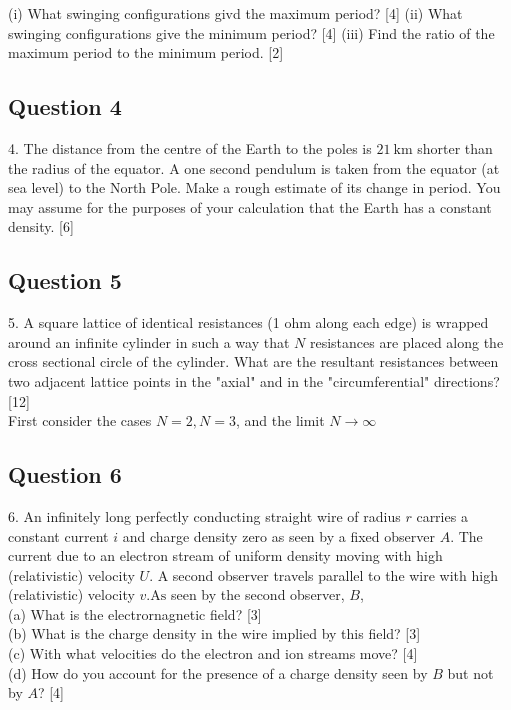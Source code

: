 \documentclass{article}
\begin{document}
(i) What swinging configurations givd the maximum period? [4]
(ii) What swinging configurations give the minimum period? [4]
(iii) Find the ratio of the maximum period to the minimum period. [2]

\subsection{Question 4}
4. The distance from the centre of the Earth to the poles is $21 \mathrm{~km}$ shorter than the radius of the equator. A one second pendulum is taken from the equator (at sea level) to the North Pole. Make a rough estimate of its change in period. You may assume for the purposes of your calculation that the Earth has a constant density. [6]

\subsection{Question 5}
5. A square lattice of identical resistances (1 ohm along each edge) is wrapped around an infinite cylinder in such a way that $N$ resistances are placed along the cross sectional circle of the cylinder. What are the resultant resistances between two adjacent lattice points in the "axial" and in the "circumferential" directions? [12] \\
First consider the cases $N=2, N=3$, and the limit $N \rightarrow \infty$

\subsection{Question 6}
6. An infinitely long perfectly conducting straight wire of radius $r$ carries a constant current $i$ and charge density zero as seen by a fixed observer $A$. The current due to an electron stream of uniform density moving with high (relativistic) velocity $U$. A second observer travels parallel to the wire with high (relativistic) velocity $v . \mathrm{As}$ seen by the second observer, $B$, \\
(a) What is the electrornagnetic field? [3] \\
(b) What is the charge density in the wire implied by this field? [3] \\
(c) With what velocities do the electron and ion streams move? [4] \\
(d) How do you account for the presence of a charge density seen by $B$ but not by $A$? [4]
\end{document}
